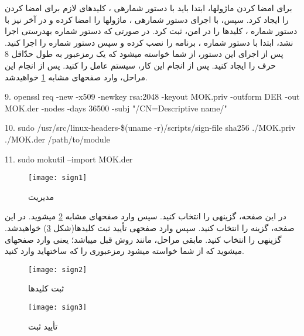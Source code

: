 برای امضا کردن ماژول\nf ها، ابتدا باید با دستور شماره\nf ی ، کلیدهای لازم برای امضا کردن را ایجاد کرد. سپس، با اجرای دستور شماره\nf ی ، ماژول\nf ها را امضا کرده و در آخر نیز با دستور شماره ، کلیدها را در  امن، ثبت کرد. در صورتی که دستور شماره  به\nf درستی اجرا نشد، ابتدا با دستور شماره ، برنامه  را نصب کرده و سپس دستور شماره  را اجرا کنید. پس از اجرای این دستور، از شما خواسته می\nf شود که یک رمزعبور به طول حدّاقل  8 حرف را ایجاد کنید. پس از انجام این کار، سیستم عامل را  کنید. پس از انجام این مراحل، وارد صفحه\nf ای مشابه \ref{sign1} خواهیدشد.
\begin{latin}
\setlength{\parindent}{0ex}
9. openssl req -new -x509 -newkey rsa:2048 -keyout MOK.priv -outform DER -out MOK.der -nodes -days 36500 -subj "/CN=Descriptive name/"

10. sudo /usr/src/linux-headers-\$(uname -r)/scripts/sign-file sha256 ./MOK.priv ./MOK.der /path/to/module

11. sudo mokutil --import MOK.der
\end{latin}

\begin{figure}[H]
\centering
\texttt{[image: sign1]}
\caption{مدیریت }
\label{sign1}
\end{figure}

در این صفحه، گزینه\nf ی  را انتخاب کنید. سپس وارد صفحه\nf ای مشابه \ref{sign2} می\nf شوید. در این صفحه، گزینه  را انتخاب کنید. سپس وارد صفحه\nf ی تأیید ثبت کلیدها(شکل \ref{sign3}) خواهیدشد. گزینه\nf ی  را انتخاب کنید. مابقی مراحل، مانند روش قبل می\nf باشد؛ یعنی وارد صفحه\nf ای می\nf شوید که از شما خواسته می\nf شود رمزعبوری را که ساخته\nf اید وارد کنید.

\begin{figure}[H]
\centering
\texttt{[image: sign2]}
\caption{ثبت کلیدها}
\label{sign2}
\end{figure}


\begin{figure}[H]
\centering
\texttt{[image: sign3]}
\caption{تأیید ثبت}
\label{sign3}
\end{figure}
